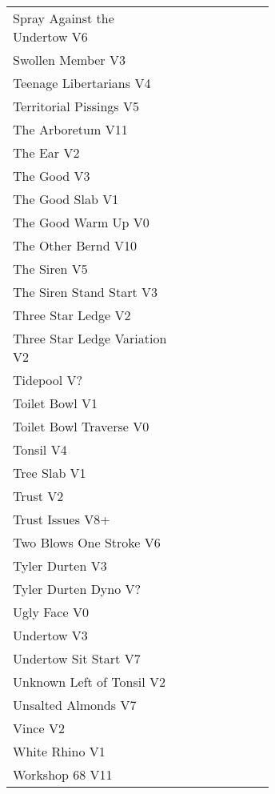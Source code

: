 \begin{flushleft}
\begin{center}
\begin{supertabular}{p{0.65\linewidth}r}
Spray Against the Undertow V6 & \pageref{vr:Spray Against the Undertow} \\
Swollen Member V3 & \pageref{rt:Swollen Member} \\
Teenage Libertarians V4 & \pageref{rt:Teenage Libertarians} \\
Territorial Pissings V5 & \pageref{rt:Territorial Pissings} \\
The Arboretum V11 & \pageref{rt:The Arboretum} \\
The Ear V2 & \pageref{rt:The Ear} \\
The Good V3 & \pageref{rt:The Good} \\
The Good Slab V1 & \pageref{rt:The Good Slab} \\
The Good Warm Up V0 & \pageref{rt:The Good Warm Up} \\
The Other Bernd V10 & \pageref{rt:The Other Bernd} \\
The Siren V5 & \pageref{rt:The Siren} \\
The Siren Stand Start V3 & \pageref{vr:The Siren Stand Start} \\
Three Star Ledge V2 & \pageref{rt:Three Star Ledge} \\
Three Star Ledge Variation V2 & \pageref{vr:Three Star Ledge Variation} \\
Tidepool V? & \pageref{rt:Tidepool} \\
Toilet Bowl V1 & \pageref{rt:Toilet Bowl} \\
Toilet Bowl Traverse V0 & \pageref{rt:Toilet Bowl Traverse} \\
Tonsil V4 & \pageref{rt:Tonsil} \\
Tree Slab V1 & \pageref{rt:Tree Slab} \\
Trust V2 & \pageref{rt:Trust} \\
Trust Issues V8+ & \pageref{rt:Trust Issues} \\
Two Blows One Stroke V6 & \pageref{rt:Two Blows One Stroke} \\
Tyler Durten V3 & \pageref{rt:Tyler Durten} \\
Tyler Durten Dyno V? & \pageref{vr:Tyler Durten Dyno} \\
Ugly Face V0 & \pageref{rt:Ugly Face} \\
Undertow V3 & \pageref{rt:Undertow} \\
Undertow Sit Start V7 & \pageref{vr:Undertow Sit Start} \\
Unknown Left of Tonsil V2 & \pageref{rt:Unknown Left of Tonsil} \\
Unsalted Almonds V7 & \pageref{rt:Unsalted Almonds} \\
Vince V2 & \pageref{rt:Vince} \\
White Rhino V1 & \pageref{rt:White Rhino} \\
Workshop 68 V11 & \pageref{rt:Workshop 68} \\
\end{supertabular}
\end{center}

\end{flushleft}
